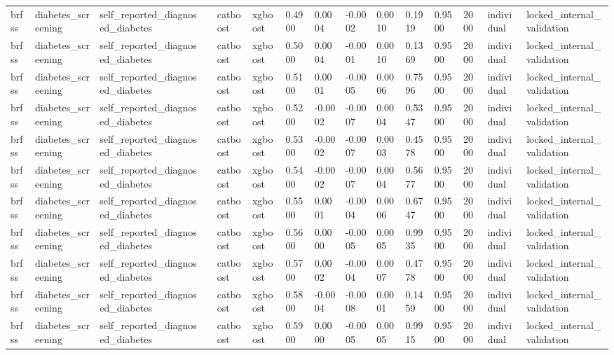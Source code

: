 \begin{tabular}{lllllllllllllll}
brfss & diabetes\_screening & self\_reported\_diagnosed\_diabetes &  & catboost & xgboost & 0.4900 & 0.0004 & -0.0002 & 0.0010 & 0.1919 & 0.9500 & 2000 & individual & locked\_internal\_validation \\
brfss & diabetes\_screening & self\_reported\_diagnosed\_diabetes &  & catboost & xgboost & 0.5000 & 0.0004 & -0.0001 & 0.0010 & 0.1369 & 0.9500 & 2000 & individual & locked\_internal\_validation \\
brfss & diabetes\_screening & self\_reported\_diagnosed\_diabetes &  & catboost & xgboost & 0.5100 & 0.0001 & -0.0005 & 0.0006 & 0.7596 & 0.9500 & 2000 & individual & locked\_internal\_validation \\
brfss & diabetes\_screening & self\_reported\_diagnosed\_diabetes &  & catboost & xgboost & 0.5200 & -0.0002 & -0.0007 & 0.0004 & 0.5347 & 0.9500 & 2000 & individual & locked\_internal\_validation \\
brfss & diabetes\_screening & self\_reported\_diagnosed\_diabetes &  & catboost & xgboost & 0.5300 & -0.0002 & -0.0007 & 0.0003 & 0.4578 & 0.9500 & 2000 & individual & locked\_internal\_validation \\
brfss & diabetes\_screening & self\_reported\_diagnosed\_diabetes &  & catboost & xgboost & 0.5400 & -0.0002 & -0.0007 & 0.0004 & 0.5677 & 0.9500 & 2000 & individual & locked\_internal\_validation \\
brfss & diabetes\_screening & self\_reported\_diagnosed\_diabetes &  & catboost & xgboost & 0.5500 & 0.0001 & -0.0004 & 0.0006 & 0.6747 & 0.9500 & 2000 & individual & locked\_internal\_validation \\
brfss & diabetes\_screening & self\_reported\_diagnosed\_diabetes &  & catboost & xgboost & 0.5600 & 0.0000 & -0.0005 & 0.0005 & 0.9935 & 0.9500 & 2000 & individual & locked\_internal\_validation \\
brfss & diabetes\_screening & self\_reported\_diagnosed\_diabetes &  & catboost & xgboost & 0.5700 & 0.0002 & -0.0004 & 0.0007 & 0.4778 & 0.9500 & 2000 & individual & locked\_internal\_validation \\
brfss & diabetes\_screening & self\_reported\_diagnosed\_diabetes &  & catboost & xgboost & 0.5800 & -0.0004 & -0.0008 & 0.0001 & 0.1459 & 0.9500 & 2000 & individual & locked\_internal\_validation \\
brfss & diabetes\_screening & self\_reported\_diagnosed\_diabetes &  & catboost & xgboost & 0.5900 & 0.0000 & -0.0005 & 0.0005 & 0.9915 & 0.9500 & 2000 & individual & locked\_internal\_validation \\

\end{tabular}
